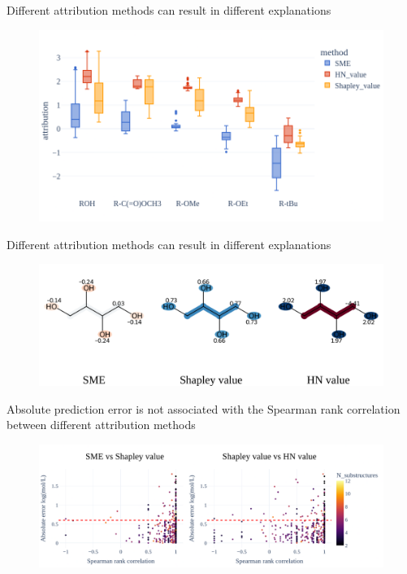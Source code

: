 \documentclass[aspectratio=169]{beamer}
\begin{document}
\begin{frame}{Different attribution methods can result in different explanations}

    \begin{figure}[h]
        \centering
        \includegraphics[scale=0.40]{../thesis/Fig/attribution_distribution_functional_groups.png}
    \end{figure}
  
\end{frame}


\begin{frame}{Different attribution methods can result in different explanations}

    \begin{figure}[h]
        \centering
        \includegraphics[scale=0.70]{../thesis/Fig/erythritol_explanations.png}
    \end{figure}
  
\end{frame}


\begin{frame}{Absolute prediction error is not associated with the Spearman rank correlation between different attribution methods}

    \begin{figure}[h]
        \centering
        \includegraphics[scale=0.70]{../thesis/Fig/rmse_vs_rank_corr_attributions.png}
    \end{figure}
   
\end{frame}
\end{document}
